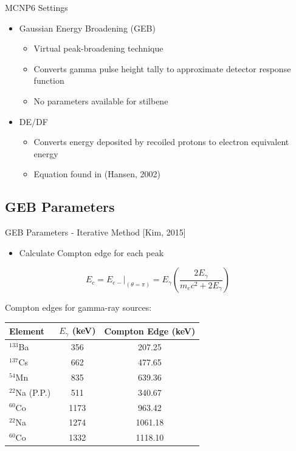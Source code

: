 \documentclass{beamer}
\begin{document}
\begin{frame}{MCNP6 Settings}
\begin{itemize}
\item Gaussian Energy Broadening (GEB)
  \begin{itemize}
  \item Virtual peak-broadening technique
  \item Converts gamma pulse height tally to approximate detector response function
  \item No parameters available for stilbene
  \end{itemize}
\item DE/DF
  \begin{itemize}
  \item Converts energy deposited by recoiled protons to electron equivalent energy
  \item Equation found in (Hansen, 2002)\cite{Hansen}
  \end{itemize}
\end{itemize}
\end{frame}

\subsection{GEB Parameters}
\begin{frame}{GEB Parameters - Iterative Method [Kim, 2015]}
  \begin{itemize}
  \item Calculate Compton edge for each peak
  \end{itemize}
  \begin{equation} \label{compton_edge}
  E_c = E_{e-}\vert_{(\theta=\pi)} = E_\gamma \left(\frac{2E_\gamma}{m_ec^2+2E_\gamma}\right)
  \end{equation}
  \begin{block}{Compton edges for gamma-ray sources:}
    \begin{center}
  \vskip -0.2cm
  \begin{tabular}{l  c  c}\toprule
   Element  & $E_\gamma$ (keV) & Compton Edge (keV) \\ \midrule \vspace{0.1cm}
   $^{133}$Ba & 356 & 207.25 \\
   $^{137}$Cs & 662 & 477.65 \\
   $^{54}$Mn & 835 & 639.36 \\
   $^{22}$Na (P.P.) & 511 & 340.67 \\
   $^{60}$Co & 1173 & 963.42 \\
   $^{22}$Na & 1274 & 1061.18 \\
   $^{60}$Co & 1332 & 1118.10 \\ \bottomrule
  \end{tabular}
  \end{center}
  \end{block}
\end{frame}
\end{document}
